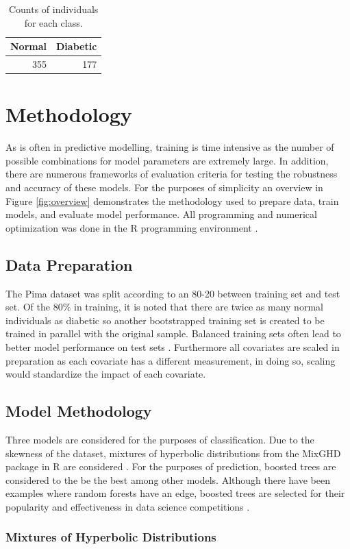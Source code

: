 \documentclass[11pt,letterpaper]{article}
\begin{document}
\begin{table}[!h]
\label{count}
\caption{Counts of individuals for each class.}
\centering
\vspace{10pt}
\begin{tabular}{|r|r|}
\hline
Normal & Diabetic \\ 
\hline
355	&	 177 	\\
\hline
\end{tabular}
\end{table}
\section{Methodology}
As is often in predictive modelling, training is time intensive as the number of possible combinations for model parameters are extremely large. In addition, there are numerous frameworks of evaluation criteria for testing the robustness and accuracy of these models. For the purposes of simplicity an overview in Figure \ref{fig:overview}
demonstrates the methodology used to prepare data, train models, and evaluate model performance. All programming and numerical optimization was done in the R programming environment \citep{Rprog}.

\subsection{Data Preparation}
The Pima dataset was split according to an 80-20 between training set and test set. Of the $80 \%$ in training, it is noted that there are twice as many  normal individuals as diabetic so another bootstrapped training set is created to be trained in parallel with the original sample. Balanced training sets often lead to better model performance on test sets \citep{imbalance}.  Furthermore all covariates are scaled in preparation as each covariate has a different measurement, in doing so, scaling would standardize the impact of each covariate. 

\subsection{Model Methodology}
Three models are considered for the purposes of classification. Due to the skewness of the dataset, mixtures of hyperbolic distributions  from the MixGHD package in R are considered \citep{mixGHD}. For the purposes of prediction, boosted trees are considered to the be the best among other models. Although there have been examples where random forests have an edge, boosted trees are selected for their popularity and effectiveness in data science competitions \citep{gbm}. \subsubsection{Mixtures of Hyperbolic Distributions}
\end{document}

